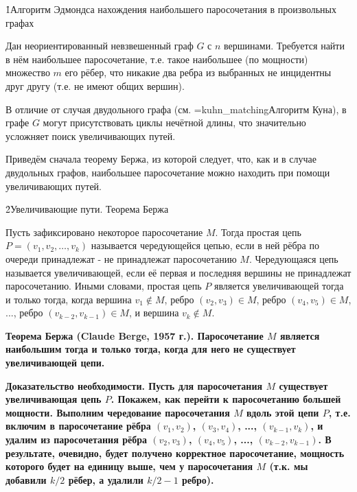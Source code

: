 \h1{Алгоритм Эдмондса нахождения наибольшего паросочетания в произвольных графах}

Дан неориентированный невзвешенный граф $G$ с $n$ вершинами. Требуется найти в нём наибольшее паросочетание, т.е. такое наибольшее (по мощности) множество $m$ его рёбер, что никакие два ребра из выбранных не инцидентны друг другу (т.е. не имеют общих вершин).

В отличие от случая двудольного графа (см. \algohref=kuhn_matching{Алгоритм Куна}), в графе $G$ могут присутствовать циклы нечётной длины, что значительно усложняет поиск увеличивающих путей.

Приведём сначала теорему Бержа, из которой следует, что, как и в случае двудольных графов, наибольшее паросочетание можно находить при помощи увеличивающих путей.


\h2{Увеличивающие пути. Теорема Бержа}

Пусть зафиксировано некоторое паросочетание $M$. Тогда простая цепь $P = (v_1, v_2, \ldots, v_k)$ называется чередующейся цепью, если в ней рёбра по очереди принадлежат - не принадлежат паросочетанию $M$. Чередующаяся цепь называется увеличивающей, если её первая и последняя вершины не принадлежат паросочетанию. Иными словами, простая цепь $P$ является увеличивающей тогда и только тогда, когда вершина $v_1 \not\in M$, ребро $(v_2,v_3) \in M$, ребро $(v_4,v_5) \in M$, ..., ребро $(v_{k-2},v_{k-1}) \in M$, и вершина $v_k \not\in M$.


\bf{Теорема Бержа} (Claude Berge, 1957 г.). Паросочетание $M$ является наибольшим тогда и только тогда, когда для него не существует увеличивающей цепи.

\bf{Доказательство необходимости}. Пусть для паросочетания $M$ существует увеличивающая цепь $P$. Покажем, как перейти к паросочетанию большей мощности. Выполним чередование паросочетания $M$ вдоль этой цепи $P$, т.е. включим в паросочетание рёбра $(v_1,v_2)$, $(v_3,v_4)$, ..., $(v_{k-1},v_k)$, и удалим из паросочетания рёбра $(v_2,v_3)$, $(v_4,v_5)$, ..., $(v_{k-2},v_{k-1})$. В результате, очевидно, будет получено корректное паросочетание, мощность которого будет на единицу выше, чем у паросочетания $M$ (т.к. мы добавили $k/2$ рёбер, а удалили $k/2-1$ ребро).

